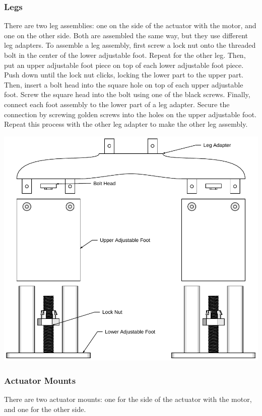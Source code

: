 \documentclass[letterpaper,10pt,english]{sphinxmanual}
\begin{document}
\subsubsection{Legs}
\label{NARFSTR:legs}
There are two leg assemblies: one on the side of the actuator with the motor, and one on the other side. Both are assembled the same way, but they use different leg adapters. To assemble a leg assembly, first screw a lock nut onto the threaded bolt in the center of the lower adjustable foot. Repeat for the other leg. Then, put an upper adjustable foot piece on top of each lower adjustable foot piece. Push down until the lock nut clicks, locking the lower part to the upper part. Then, insert a bolt head into the square hole on top of each upper adjustable foot. Screw the square head into the bolt using one of the black screws. Finally, connect each foot assembly to the lower part of a leg adapter. Secure the connection by screwing golden screws into the holes on the upper adjustable foot. Repeat this process with the other leg adapter to make the other leg assembly.

\includegraphics{LegAssembly.pdf}


\subsubsection{Actuator Mounts}
\label{NARFSTR:actuator-mounts}
There are two actuator mounts: one for the side of the actuator with the motor, and one for the other side.
\end{document}
